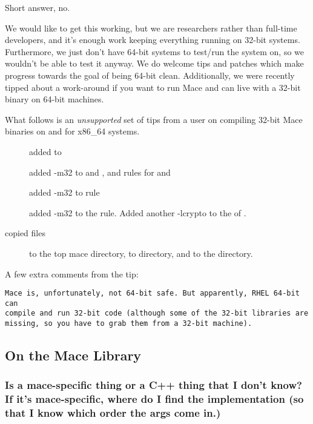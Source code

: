 Short answer, no.

We would like to get this working, but we are researchers rather than
full-time developers, and it's enough work keeping everything running on
32-bit systems.  Furthermore, we just don't have 64-bit systems to
test/run the system on, so we wouldn't be able to test it anyway.  We do
welcome tips and patches which make progress towards the goal of being
64-bit clean.  Additionally, we were recently tipped about a work-around
if you want to run Mace and can live with a 32-bit binary on 64-bit
machines.

What follows is an \emph{unsupported} set of tips from a user on
compiling 32-bit Mace binaries on and for x86\_64 systems.

\begin{description}
\item[] added  to 
\item[] added -m32 to 
and , and rules for  and
\item[] added -m32 to
 rule
\item[] added -m32 to the
 rule. Added another -lcrypto to the
 of .
\item[copied files] 
to the top mace directory,  to  directory, and
 to the  directory.
\end{description}

A few extra comments from the tip:
\begin{verbatim}
Mace is, unfortunately, not 64-bit safe. But apparently, RHEL 64-bit can
compile and run 32-bit code (although some of the 32-bit libraries are
missing, so you have to grab them from a 32-bit machine).
\end{verbatim}

\subsection{On the Mace Library}

\subsubsection*{Is  a mace-specific
thing or a C++ thing that I don't know?  If it's mace-specific, where do
I find the implementation (so that I know which order the args come
in.)}

